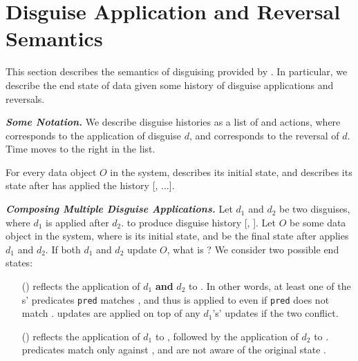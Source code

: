 \section{Disguise Application and Reversal Semantics}
\label{sec:comp}
This section describes the semantics of disguising provided by \sys. In particular, we describe the end state
of data given some history of disguise applications and reversals.

\vspace{6pt}\noindent\textbf{\emph{Some Notation.}}
We describe disguise histories as a list of  and  actions, where  corresponds
to the application of disguise $d$, and  corresponds to the reversal of $d$. Time moves to
the right in the list.

For every data object $O$ in the system, \ostart describes its initial state, and
 describes its state after \sys has applied the history [,
$\dots$].

\vspace{6pt}\noindent\textbf{\emph{Composing Multiple Disguise Applications.}}
Let $d_1$ and $d_2$ be two disguises, where $d_1$ is applied after $d_2$.
to produce disguise history [, ]. 
%
Let $O$ be some data object in the system, where \ostart is its initial state, and
 be the final state after \sys applies $d_1$ and $d_2$.
%
If both $d_1$ and $d_2$ update $O$, what is ?
We consider two possible end states: 
%
\begin{enumerate}
\item[(\appcompone)]  reflects the application of $d_1$ \textbf{and} $d_2$ to \ostart. In other
words, at least one of the s' predicates \texttt{pred} matches \ostart, and thus  is
applied to \ohist[\app{d_1}] even if \texttt{pred} does not match \ohist[\app{d_1}]. 
 updates are applied on top of any $d_1$'s' updates if the two conflict.

\item[(\appcomptwo)]  reflects the application of $d_1$ to \ostart, followed
by the application of $d_2$ to \ohist{[\app{d_1}]}.  predicates match only against
\ohist{[\app{d_1}]}, and are not aware of the original state \ostart.
\end{enumerate}

